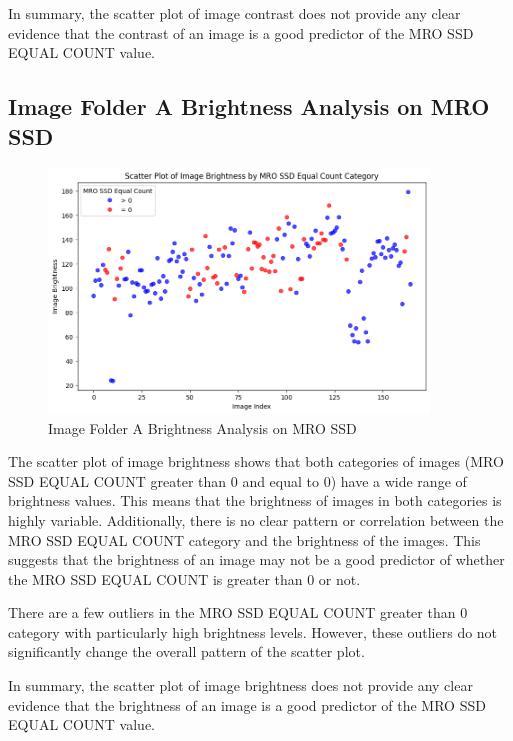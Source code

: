In summary, the scatter plot of image contrast does not provide any clear evidence that the contrast of an image is a good predictor of the MRO SSD EQUAL COUNT value.

\newpage

\subsection{Image Folder A Brightness Analysis on MRO SSD}


\begin{figure}[ht]
    \centering
    \includegraphics[width=0.9\textwidth]{Figures/Results/sipa_02/brightness.png}
    \caption[Image Folder A Brightness Analysis on MRO SSD]{Image Folder A Brightness Analysis on MRO SSD}
    \label{fig:Image Folder A Brightness Analysis on MRO SSD}
\end{figure}



The scatter plot of image brightness shows that both categories of images (MRO SSD EQUAL COUNT greater than 0 and equal to 0) have a wide range of brightness values. This means that the brightness of images in both categories is highly variable. Additionally, there is no clear pattern or correlation between the MRO SSD EQUAL COUNT category and the brightness of the images. This suggests that the brightness of an image may not be a good predictor of whether the MRO SSD EQUAL COUNT is greater than 0 or not.

There are a few outliers in the MRO SSD EQUAL COUNT greater than 0 category with particularly high brightness levels. However, these outliers do not significantly change the overall pattern of the scatter plot.

In summary, the scatter plot of image brightness does not provide any clear evidence that the brightness of an image is a good predictor of the MRO SSD EQUAL COUNT value.

